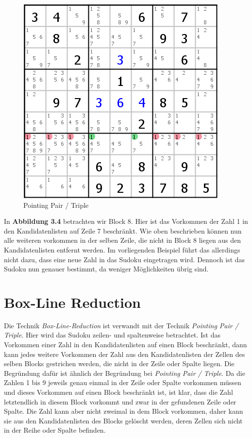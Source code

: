 \documentclass[accentcolor=tud6b,11pt,paper=a4]{tudreport}
\begin{document}
\begin{figure}[h]
\begin{center}
\includegraphics{./img/pointing_pair_triple.png}
\caption{Pointing Pair / Triple}
\end{center}
\end{figure}

In \textbf{Abbildung 3.4} betrachten wir Block 8. Hier ist das Vorkommen der Zahl 1 in den Kandidatenlisten auf Zeile 7 beschränkt. Wie oben beschrieben können nun alle weiteren vorkommen in der selben Zeile, die nicht in Block 8 liegen aus den Kandidatenlisten entfernt werden. Im vorliegenden Beispiel führt das allerdings nicht dazu, dass eine neue Zahl in das Sudoku eingetragen wird. Dennoch ist das Sudoku nun genauer bestimmt, da weniger Möglichkeiten übrig sind.

\newpage
\section{Box-Line Reduction}
Die Technik \textit{Box-Line-Reduction} ist verwandt mit der Technik \textit{Pointing Pair / Triple}. Hier wird das Sudoku zeilen- und spaltenweise betrachtet. Ist das Vorkommen einer Zahl in den Kandidatenlisten auf einen Block beschränkt, dann kann jedes weitere Vorkommen der Zahl aus den Kandidatenlisten der Zellen des selben Blocks gestrichen werden, die nicht in der Zeile oder Spalte liegen. Die Begründung dafür ist ähnlich der Begründung bei \textit{Pointing Pair / Triple}. Da die Zahlen 1 bis 9 jeweils genau einmal in der Zeile oder Spalte vorkommen müssen und dieses Vorkommen auf einen Block beschränkt ist, ist klar, dass die Zahl letztendlich in diesem Block vorkommt und zwar in der gefundenen Zeile oder Spalte. Die Zahl kann aber nicht zweimal in dem Block vorkommen, daher kann sie aus den Kandidatenlisten des Blocks gelöscht werden, deren Zellen sich nicht in der Reihe oder Spalte befinden.
\end{document}
